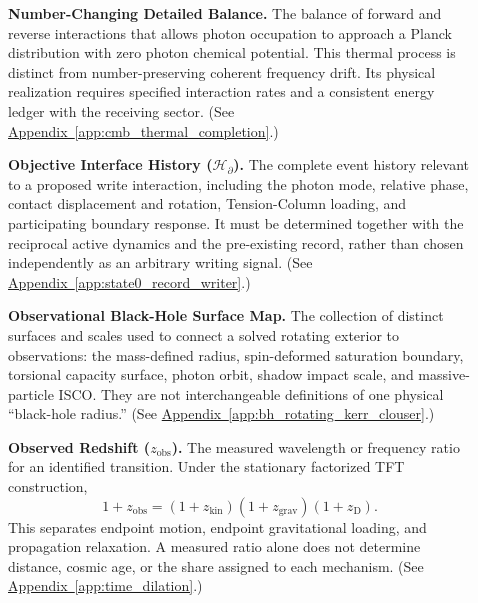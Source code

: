 \begin{description}
\item[] \begin{minipage}[t]{\linewidth}
\textbf{Number-Changing Detailed Balance.} The balance of forward and reverse interactions that allows photon occupation to approach a Planck distribution with zero photon chemical potential. This thermal process is distinct from number-preserving coherent frequency drift. Its physical realization requires specified interaction rates and a consistent energy ledger with the receiving sector.
(See \hyperref[app:cmb_thermal_completion]{Appendix~\ref*{app:cmb_thermal_completion}}.)
\end{minipage}

\item[] \begin{minipage}[t]{\linewidth}
\textbf{Objective Interface History ($\mathcal H_\partial$).} The complete event history relevant to a proposed write interaction, including the photon mode, relative phase, contact displacement and rotation, Tension-Column loading, and participating boundary response. It must be determined together with the reciprocal active dynamics and the pre-existing record, rather than chosen independently as an arbitrary writing signal.
(See \hyperref[app:state0_record_writer]{Appendix~\ref*{app:state0_record_writer}}.)
\end{minipage}

\item[] \begin{minipage}[t]{\linewidth}
\textbf{Observational Black-Hole Surface Map.} The collection of distinct surfaces and scales used to connect a solved rotating exterior to observations: the mass-defined radius, spin-deformed saturation boundary, torsional capacity surface, photon orbit, shadow impact scale, and massive-particle ISCO. They are not interchangeable definitions of one physical ``black-hole radius.''
(See \hyperref[app:bh_rotating_kerr_clouser]{Appendix~\ref*{app:bh_rotating_kerr_clouser}}.)
\end{minipage}

\item[] \begin{minipage}[t]{\linewidth}
\textbf{Observed Redshift ($z_{\mathrm{obs}}$).} The measured wavelength or frequency ratio for an identified transition. Under the stationary factorized TFT construction,
\[
 1+z_{\mathrm{obs}}
 =(1+z_{\mathrm{kin}})(1+z_{\mathrm{grav}})(1+z_{\mathrm D}).
\]
This separates endpoint motion, endpoint gravitational loading, and propagation relaxation. A measured ratio alone does not determine distance, cosmic age, or the share assigned to each mechanism.
(See \hyperref[app:time_dilation]{Appendix~\ref*{app:time_dilation}}.)
\end{minipage}


\end{description}
